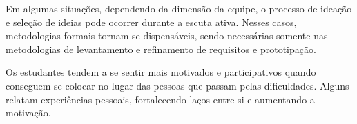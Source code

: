 Em algumas situações, dependendo da dimensão da equipe, o processo de ideação e seleção de ideias pode ocorrer durante a escuta ativa. Nesses casos, metodologias formais tornam-se dispensáveis, sendo necessárias somente nas metodologias de levantamento e refinamento de requisitos e prototipação.

Os estudantes tendem a se sentir mais motivados e participativos quando conseguem se colocar no lugar das pessoas que passam pelas dificuldades. Alguns relatam experiências pessoais, fortalecendo laços entre si e aumentando a motivação.
